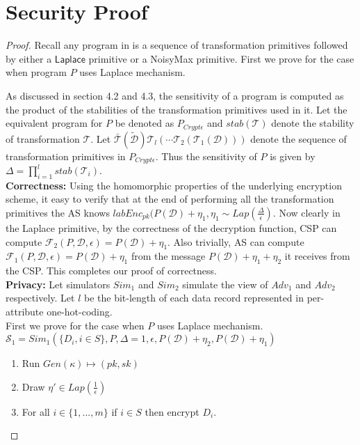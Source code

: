 \section{Security Proof}
\begin{proof}
Recall any program in \system is a sequence of transformation primitives followed by either a $\textsf{Laplace}$ primitive or a \textsf{NoisyMax} primitive. First we prove for the case when program $P$ uses Laplace mechanism.

As discussed in section 4.2 and 4.3, the sensitivity of a \system program is computed as the product of the stabilities of the transformation primitives used in it.
Let the equivalent \system program for $P$ be denoted as $P_{Crypt\epsilon}$ and $stab(\mathcal{T})$ denote the stability of transformation $\mathcal{T}$. Let $\bar{\mathcal{T}}(\boldsymbol{\tilde{\mathcal{D}}})\mathcal{T}_l(\cdots\mathcal{T}_2(\mathcal{T}_1(\mathcal{D})))$ denote the sequence of transformation primitives in $P_{Crypt\epsilon}$. Thus the sensitivity of $P$ is given by $\Delta=\prod_{i=1}^l stab(\mathcal{T}_i)$.\\
\textbf{Correctness:}
 Using the homomorphic properties of the underlying encryption
scheme, it easy to verify that at the end of performing all the transformation primitives the \textsf{AS} knows $labEnc_{pk}(P(\mathcal{D})+\eta_1, \eta_1 \sim Lap(\frac{\Delta}{\epsilon})$.  Now clearly in the \textsf{Laplace} primitive, by the correctness of the decryption function, \textsf{CSP} can compute $\mathcal{F}_2(P,\mathcal{D},\epsilon)=P(\mathcal{D})+\eta_1$. Also trivially, \textsf{AS} can compute $\mathcal{F}_1(P,\mathcal{D},\epsilon)=P(\mathcal{D})+\eta_1$ from the message $P(\mathcal{D})+\eta_1+\eta_2$ it receives from the \textsf{CSP}. This completes our proof of correctness. \\
\textbf{Privacy:}
Let simulators $Sim_1$ and $Sim_2$ simulate the view of ${Adv}_1$ and $Adv_2$ respectively. 
Let $l$ be the bit-length of each data record represented in per-attribute one-hot-coding. \\
First we prove for the case when $P$ uses Laplace mechanism.
$\mathcal{S}_1=Sim_1(\{D_i, i \in S\}, P,\Delta=1,\epsilon, P(\mathcal{D})+\eta_2,P(\mathcal{D})+\eta_1)$
\begin{enumerate}\item Run $Gen(\kappa)\mapsto (pk,sk)$ 
\item Draw $\eta' \in Lap(\frac{1}{\epsilon})$
\item For all $i \in \{1,...,m\}$ if $i \in S$ then encrypt $D_i$. 

\end{enumerate}
\end{proof}
